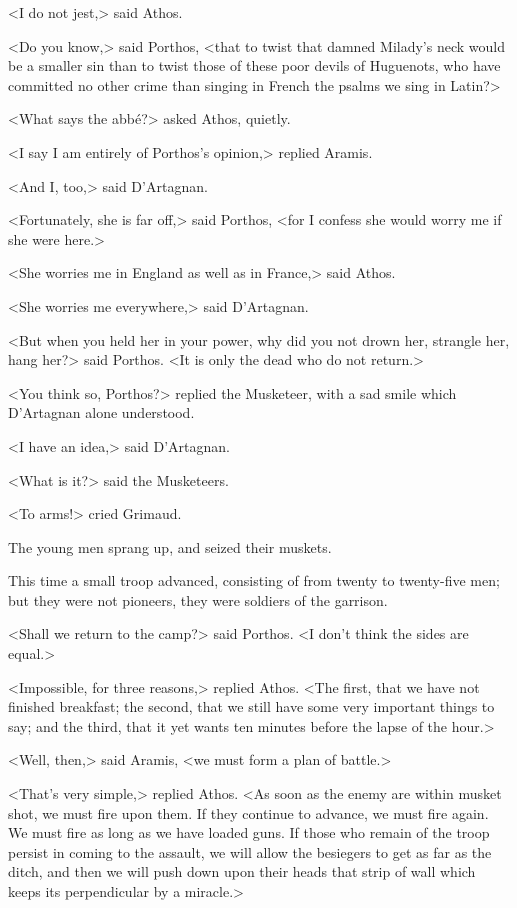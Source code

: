 <I do not jest,> said Athos. 

<Do you know,> said Porthos, <that to twist that damned Milady's neck would be a smaller sin than to twist those of these poor devils of Huguenots, who have committed no other crime than singing in French the psalms we sing in Latin?> 

<What says the abbé?> asked Athos, quietly. 

<I say I am entirely of Porthos's opinion,> replied Aramis. 

<And I, too,> said D'Artagnan. 

<Fortunately, she is far off,> said Porthos, <for I confess she would worry me if she were here.> 

<She worries me in England as well as in France,> said Athos. 

<She worries me everywhere,> said D'Artagnan. 

<But when you held her in your power, why did you not drown her, strangle her, hang her?> said Porthos. <It is only the dead who do not return.> 

<You think so, Porthos?> replied the Musketeer, with a sad smile which D'Artagnan alone understood. 

<I have an idea,> said D'Artagnan. 

<What is it?> said the Musketeers. 

<To arms!> cried Grimaud. 

The young men sprang up, and seized their muskets. 

This time a small troop advanced, consisting of from twenty to twenty-five men; but they were not pioneers, they were soldiers of the garrison. 

<Shall we return to the camp?> said Porthos. <I don't think the sides are equal.> 

<Impossible, for three reasons,> replied Athos. <The first, that we have not finished breakfast; the second, that we still have some very important things to say; and the third, that it yet wants ten minutes before the lapse of the hour.> 

<Well, then,> said Aramis, <we must form a plan of battle.> 

<That's very simple,> replied Athos. <As soon as the enemy are within musket shot, we must fire upon them. If they continue to advance, we must fire again. We must fire as long as we have loaded guns. If those who remain of the troop persist in coming to the assault, we will allow the besiegers to get as far as the ditch, and then we will push down upon their heads that strip of wall which keeps its perpendicular by a miracle.> 


